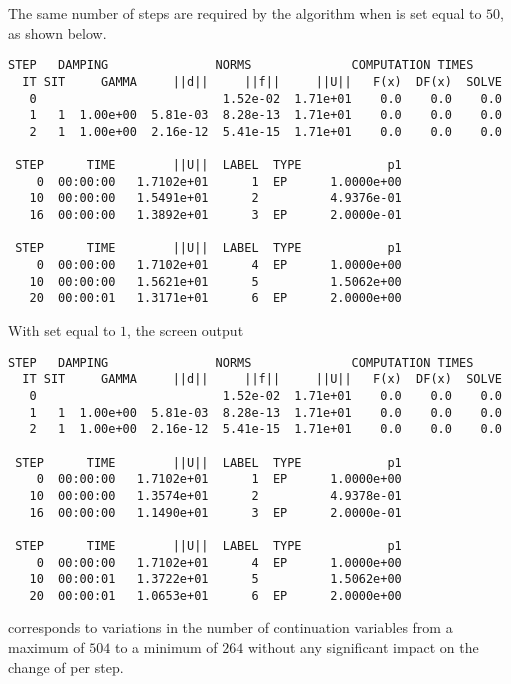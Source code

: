 The same number of steps are required by the algorithm when  is set equal to $50$, as shown below.
\begin{lstlisting}[language=coco-highlight]
    STEP   DAMPING               NORMS              COMPUTATION TIMES
  IT SIT     GAMMA     ||d||     ||f||     ||U||   F(x)  DF(x)  SOLVE
   0                          1.52e-02  1.71e+01    0.0    0.0    0.0
   1   1  1.00e+00  5.81e-03  8.28e-13  1.71e+01    0.0    0.0    0.0
   2   1  1.00e+00  2.16e-12  5.41e-15  1.71e+01    0.0    0.0    0.0

 STEP      TIME        ||U||  LABEL  TYPE            p1
    0  00:00:00   1.7102e+01      1  EP      1.0000e+00
   10  00:00:00   1.5491e+01      2          4.9376e-01
   16  00:00:00   1.3892e+01      3  EP      2.0000e-01

 STEP      TIME        ||U||  LABEL  TYPE            p1
    0  00:00:00   1.7102e+01      4  EP      1.0000e+00
   10  00:00:00   1.5621e+01      5          1.5062e+00
   20  00:00:01   1.3171e+01      6  EP      2.0000e+00
\end{lstlisting}
With  set equal to $1$, the screen output
\begin{lstlisting}[language=coco-highlight]
    STEP   DAMPING               NORMS              COMPUTATION TIMES
  IT SIT     GAMMA     ||d||     ||f||     ||U||   F(x)  DF(x)  SOLVE
   0                          1.52e-02  1.71e+01    0.0    0.0    0.0
   1   1  1.00e+00  5.81e-03  8.28e-13  1.71e+01    0.0    0.0    0.0
   2   1  1.00e+00  2.16e-12  5.41e-15  1.71e+01    0.0    0.0    0.0

 STEP      TIME        ||U||  LABEL  TYPE            p1
    0  00:00:00   1.7102e+01      1  EP      1.0000e+00
   10  00:00:00   1.3574e+01      2          4.9378e-01
   16  00:00:00   1.1490e+01      3  EP      2.0000e-01

 STEP      TIME        ||U||  LABEL  TYPE            p1
    0  00:00:00   1.7102e+01      4  EP      1.0000e+00
   10  00:00:01   1.3722e+01      5          1.5062e+00
   20  00:00:01   1.0653e+01      6  EP      2.0000e+00
\end{lstlisting}
corresponds to variations in the number of continuation variables from a maximum of $504$ to a minimum of $264$ without any significant impact on the change of  per step.


